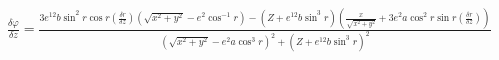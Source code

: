 \documentclass{standalone}
\begin{document}
    $\frac{\delta \varphi}{\delta z} = \frac{ 3e^{12} b{\sin^2 r}{\cos r} (\frac{\delta r}{\delta z})(\sqrt{x^2+y^2} -
    e^2 {\cos^{-1} r}) - (Z + e^{12}b{\sin^3 r}) (\frac{x}{\sqrt{x^2+y^2}} + 3e^2 a {\cos^2 r}{\sin r} (\frac{\delta r}{\delta z}) ) }{(\sqrt{x^2+y^2}-e^2 a {\cos^3 r})^2 + (Z + e^12 b {\sin^3 r})^2}$
\end{document}
